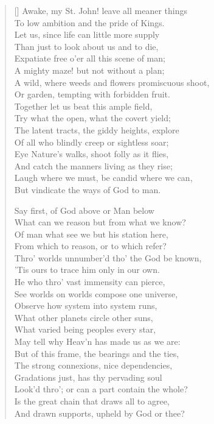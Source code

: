 \settowidth{}
\begin{verse}[\versewidth]\normalsize
Awake, my St. John! leave all meaner things\\
To low ambition and the pride of Kings.\\
Let us, since life can little more supply\\
Than just to look about us and to die,\\
Expatiate free o'er all this scene of man;\\
A mighty maze! but not without a plan;\\
A wild, where weeds and flowers promiscuous shoot,\\
Or garden, tempting with forbidden fruit.\\
Together let us beat this ample field,\\
Try what the open, what the covert yield;\\
The latent tracts, the giddy heights, explore\\
Of all who blindly creep or sightless soar;\\
Eye Nature's walks, shoot folly as it flies,\\
And catch the manners living as they rise;\\
Laugh where we must, be candid where we can,\\
But vindicate the ways of God to man.

Say first, of God above or Man below\\
What can we reason but from what we know?\\
Of man what see we but his station here,\\
From which to reason, or to which refer?\\
Thro' worlds unnumber'd tho' the God be known,\\
'Tis ours to trace him only in our own.\\
He who thro' vast immensity can pierce,\\
See worlds on worlds compose one universe,\\
Observe how system into system runs,\\
What other planets circle other suns,\\
What varied being peoples every star,\\
May tell why Heav'n has made us as we are:\\
But of this frame, the bearings and the ties,\\
The strong connexions, nice dependencies,\\
Gradations just, has thy pervading soul\\
Look'd thro'; or can a part contain the whole?\\
\vin Is the great chain that draws all to agree,\\
And drawn supports, upheld by God or thee?


\end{verse}
